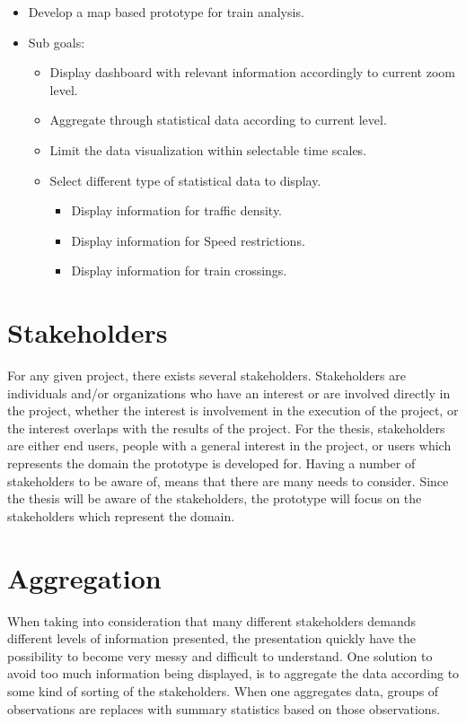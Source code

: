 \begin{itemize}
	\item Develop a map based prototype for train analysis.
	\item Sub goals:
	\begin{itemize}
		\item Display dashboard with relevant information accordingly to current zoom level.
		\item Aggregate through statistical data according to current level.
		\item Limit the data visualization within selectable time scales.
		\item Select different type of statistical data to display.
		\begin{itemize}
			\item Display information for traffic density.
			\item Display information for Speed restrictions.
			\item Display information for train crossings.
		\end{itemize}
	\end{itemize}
\end{itemize}

\section{Stakeholders} %
\label{sec:intro_stakeholders}  
For any given project, there exists several stakeholders. Stakeholders are 
individuals and/or organizations who have an interest or are involved directly 
in the project, whether the interest is involvement in the execution of the 
project, or the interest overlaps with the results of the project. 
For the thesis, stakeholders are either end users, people with a general
interest in the project, or users which represents the domain the prototype is
developed for. Having a number of stakeholders to be aware of, means that there
are many needs to consider. Since the thesis will be aware of the stakeholders,
the prototype will focus on the stakeholders which represent the domain.

\section{Aggregation} %
\label{sec:intro_aggregation}
When taking into consideration that many different stakeholders demands 
different levels of information presented, the presentation quickly have the 
possibility to become very messy and difficult to understand. One solution to 
avoid too much information being displayed, is to aggregate the data according 
to some kind of sorting of the stakeholders. When one aggregates data, groups 
of observations are replaces with summary statistics based on those 
observations\cite{ wiki:Aggregation}.

